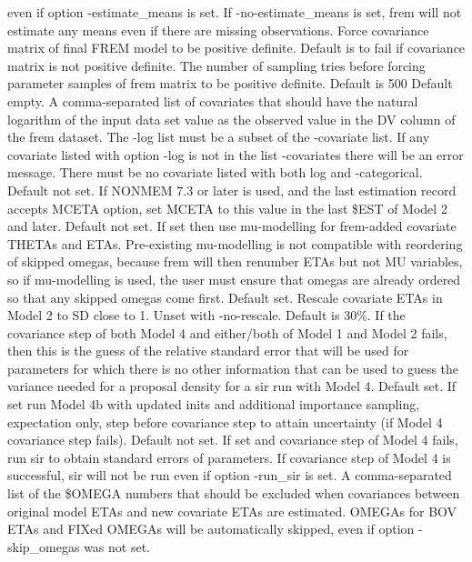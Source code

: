 \begin{optionlist}
even if option -estimate\_means is set. If -no-estimate\_means is set, frem will not estimate
any means even if there are missing observations.
\nextopt
{}
    Force covariance matrix of final FREM model to be positive definite.
    Default is to fail if covariance matrix is not positive definite.
\nextopt
{}
    The number of sampling tries before forcing parameter samples of frem matrix to be positive definite.
    Default is 500
\nextopt
{}
Default empty. A comma-separated list of covariates	that should have the natural logarithm of the input data
set value as the observed value in the DV column of the frem dataset. The -log list must be a subset of the
-covariate list. If any covariate listed with option -log is not in the list -covariates there will be an
error message. There must be no covariate listed with both log and -categorical.
\nextopt
{}
Default not set. If NONMEM 7.3 or later is used, and the last estimation record accepts MCETA option, set MCETA to this value
in the last \$EST of Model 2 and later.
\nextopt
{}
Default not set. If set then use mu-modelling for frem-added covariate THETAs and ETAs. Pre-existing
mu-modelling is not compatible with reordering of skipped omegas, because frem will then renumber ETAs
but not MU variables, so if mu-modelling is used, the user must ensure that omegas are already ordered
so that any skipped omegas come first.
\nextopt
{}
Default set. Rescale covariate ETAs in Model 2 to SD close to 1. Unset with -no-rescale.
\nextopt
{}
Default is 30\%.
If the covariance step of both Model 4 and either/both of Model 1 and Model 2 fails, then this is the guess of the
relative standard error that will be used for parameters for which there is no other information that can be used
to guess the variance needed for a proposal density for a sir run with Model 4.
\nextopt
{}
Default set. If set run Model 4b with updated inits and additional importance sampling, expectation only,
step before covariance step to attain uncertainty (if Model 4 covariance step fails).
Default not set. If set and covariance step of Model 4 fails, run sir to obtain standard errors of parameters.
If covariance step of Model 4 is successful, sir will not be run even if option -run\_sir is set.
\nextopt
{}
A comma-separated list of the \$OMEGA numbers that should be excluded when covariances
between original model ETAs and new covariate ETAs are estimated.
OMEGAs for BOV ETAs and FIXed OMEGAs will be automatically skipped,
even if option -skip\_omegas was not set.
\nextopt
\end{optionlist}


